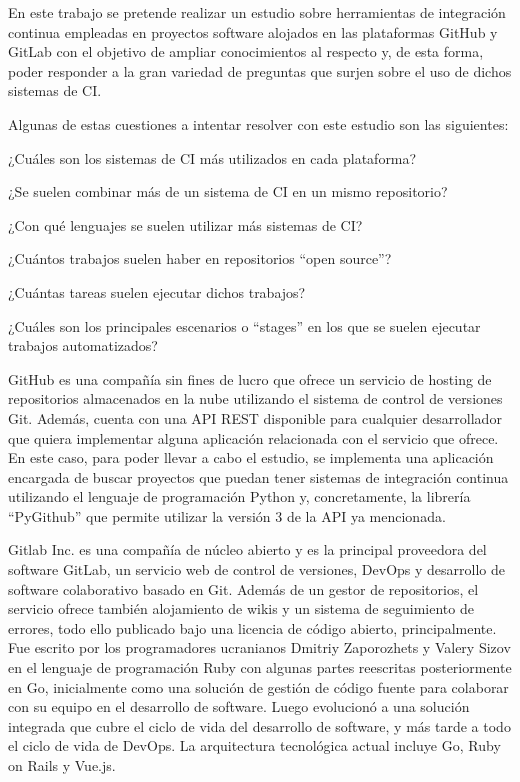 En este trabajo se pretende realizar un estudio sobre herramientas de integración continua empleadas en proyectos software alojados en las plataformas GitHub y GitLab con el objetivo de ampliar conocimientos al respecto y, de esta forma, poder responder a la gran variedad de preguntas que surjen sobre el uso de dichos sistemas de CI.

Algunas de estas cuestiones a intentar resolver con este estudio son las siguientes:
\begin{compactitem}
    \item ¿Cuáles son los sistemas de CI más utilizados en cada plataforma?
    \item ¿Se suelen combinar más de un sistema de CI en un mismo repositorio?
    \item ¿Con qué lenguajes se suelen utilizar más sistemas de CI?
    \item ¿Cuántos trabajos suelen haber en repositorios ``open source''?
    \item ¿Cuántas tareas suelen ejecutar dichos trabajos?
    \item ¿Cuáles son los principales escenarios o ``stages'' en los que se suelen ejecutar trabajos automatizados?
\end{compactitem}

GitHub es una compañía sin fines de lucro que ofrece un servicio de hosting de repositorios almacenados en la nube utilizando el sistema de control de versiones Git. 
Además, cuenta con una API REST disponible para cualquier desarrollador que quiera implementar alguna aplicación relacionada con el servicio que ofrece. 
En este caso, para poder llevar a cabo el estudio, se implementa una aplicación encargada de buscar proyectos que puedan tener sistemas de integración continua utilizando el lenguaje de programación Python y, concretamente, la librería “PyGithub” que permite utilizar la versión 3 de la API ya mencionada.

Gitlab Inc. es una compañía de núcleo abierto y es la principal proveedora del software GitLab, un servicio web de control de versiones, DevOps y desarrollo de software colaborativo basado en Git. Además de un gestor de repositorios, el servicio ofrece también alojamiento de wikis y un sistema de seguimiento de errores, todo ello publicado bajo una licencia de código abierto, principalmente.
Fue escrito por los programadores ucranianos Dmitriy Zaporozhets y Valery Sizov en el lenguaje de programación Ruby con algunas partes reescritas posteriormente en Go, inicialmente como una solución de gestión de código fuente para colaborar con su equipo en el desarrollo de software. Luego evolucionó a una solución integrada que cubre el ciclo de vida del desarrollo de software, y más tarde a todo el ciclo de vida de DevOps. 
La arquitectura tecnológica actual incluye Go, Ruby on Rails y Vue.js.

